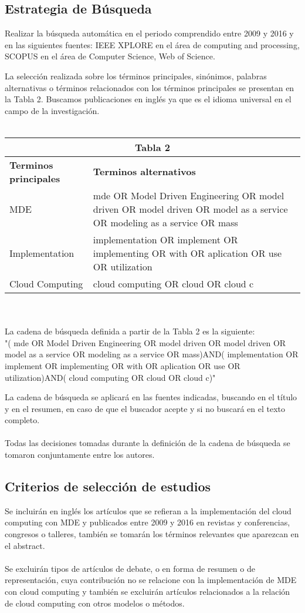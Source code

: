 \documentclass{llncs}
\begin{document}
\subsection{Estrategia de Búsqueda}
Realizar la búsqueda automática  en el periodo comprendido entre 2009 y 2016 y en las siguientes fuentes: IEEE XPLORE en el área de computing and processing, SCOPUS en el área de Computer Science, Web of Science.

La selección realizada sobre los términos principales, sinónimos, palabras alternativas o términos relacionados con los términos principales se presentan en la Tabla 2. Buscamos publicaciones en inglés ya que es el idioma universal en el campo de la investigación.\\ \\
\begin{tabular}{  | p{5cm} | p{7cm}  | }
  \hline
  \multicolumn{2}{|c|}{\bf Tabla 2} \\
  \hline
  \bf Terminos principales & \bf Terminos alternativos \\
  \hline
    MDE & mde OR Model Driven Engineering OR model driven OR model driven OR model as a service OR modeling as a service OR mass\\
   \hline
    Implementation & implementation OR implement OR implementing OR with OR aplication OR use OR utilization\\
   \hline
   Cloud Computing & cloud computing OR  cloud OR cloud c\\
   \hline
\end{tabular}\\ \\
La cadena de búsqueda definida a partir de la Tabla 2 es la siguiente: \\
"( mde OR Model Driven Engineering OR model driven OR model driven OR model as a service OR modeling as a service OR mass)AND( implementation OR implement OR implementing OR with OR aplication OR use OR utilization)AND( cloud computing OR  cloud OR cloud c)"

La cadena de búsqueda  se aplicará en las fuentes indicadas, buscando en el título y en el resumen, en caso de que el buscador acepte y si no buscará en el texto completo.\\ \\
Todas las decisiones tomadas durante la definición de la cadena de búsqueda se tomaron conjuntamente entre los autores.

\subsection{Criterios de selección de estudios}
Se incluirán en inglés los artículos que se refieran a la implementación del cloud computing con MDE y publicados entre 2009 y 2016 en revistas y conferencias, congresos o talleres, también se tomarán los términos relevantes que aparezcan en el abstract.\\\\
Se excluirán tipos de artículos de debate, o en forma de resumen o de representación, cuya contribución no se relacione con la implementación de MDE con cloud computing y también se excluirán artículos relacionados a la relación de cloud computing con otros modelos o métodos.
\end{document}
